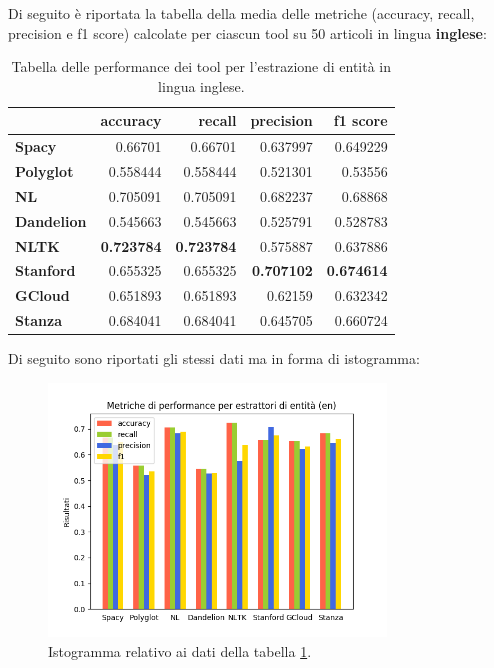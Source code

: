 \documentclass[a4paper,11pt]{article}
\begin{document}
Di seguito è riportata la tabella della media delle metriche (accuracy, recall, precision e f1 score) calcolate per ciascun tool su 50 articoli in lingua \textbf{inglese}:
\begin{table}[H]
\centering
{\renewcommand{\arraystretch}{1.35}%
\begin{tabular}{|l|r|r|r|r|}
\hline
{} &  \textbf{accuracy} & \textbf{recall} & \textbf{precision} & \textbf{f1 score} \\\hline
\textbf{Spacy    } &   0.66701 &   0.66701 &  0.637997 &  0.649229 \\\hline
\textbf{Polyglot } &  0.558444 &  0.558444 &  0.521301 &   0.53556 \\\hline
\textbf{NL       } &  0.705091 &  0.705091 &  0.682237 &   0.68868 \\\hline
\textbf{Dandelion} &  0.545663 &  0.545663 &  0.525791 &  0.528783 \\\hline
\textbf{NLTK     } &  \textbf{0.723784} &  \textbf{0.723784} &  0.575887 &  0.637886 \\\hline
\textbf{Stanford } &  0.655325 &  0.655325 &  \textbf{0.707102} &  \textbf{0.674614} \\\hline
\textbf{GCloud   } &  0.651893 &  0.651893 &   0.62159 &  0.632342 \\\hline
\textbf{Stanza   } &  0.684041 &  0.684041 &  0.645705 &  0.660724 \\
\hline
\end{tabular}}
\caption{\label{tab:en-results}Tabella delle performance dei tool per l'estrazione di entità in lingua inglese.}
\end{table}

Di seguito sono riportati gli stessi dati ma in forma di istogramma:

\begin{figure}[H]
\centering
\includegraphics[width=0.8\textwidth]{img/results-en}
\vspace*{-5mm}
\caption{Istogramma relativo ai dati della tabella \ref{tab:en-results}.}
\label{fig:results-en}
\end{figure}
\end{document}
